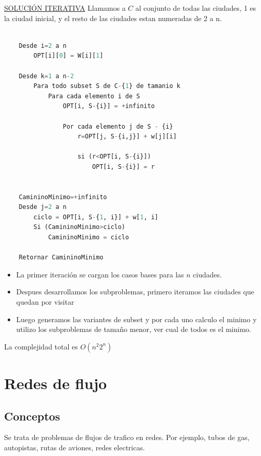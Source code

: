 \documentclass{article}
\begin{document}
\noindent
\underline{SOLUCIÓN ITERATIVA}
Llamamos a \(C\) al conjunto de todas las ciudades, 1 es la ciudad inicial, y el resto de las ciudades
estan numeradas de 2 a n.


\begin{lstlisting}[language=Python, caption=Solución iterativa]

    Desde i=2 a n
        OPT[i][0] = W[i][1]
    
    Desde k=1 a n-2
        Para todo subset S de C-{1} de tamanio k
            Para cada elemento i de S
                OPT[i, S-{i}] = +infinito

                Por cada elemento j de S - {i}
                    r=OPT[j, S-{i,j}] + w[j][i]

                    si (r<OPT[i, S-{i}])
                        OPT[i, S-{i}] = r

    
    CamininoMinimo=+infinito
    Desde j=2 a n
        ciclo = OPT[i, S-{1, i}] + w[1, i]
        Si (CamininoMinimo>ciclo)
            CamininoMinimo = ciclo
    
    Retornar CamininoMinimo

\end{lstlisting}

\begin{itemize}
    \item La primer iteración se cargan los casos bases para las \(n\) ciudades.
    \item Despues desarrollamos los subproblemas, primero iteramos las ciudades que quedan por visitar
    \item Luego generamos las variantes de subset y por cada uno calculo el minimo y 
    utilizo los subproblemas de tamaño menor, ver cual de todos es el minimo.
\end{itemize}

La complejidad total es \(O(n^2 2^n)\)

\newpage
\section{Redes de flujo}

\subsection{Conceptos}

Se trata de problemas de flujos de trafico en redes. 
Por ejemplo, tubos de gas, autopistas, rutas de aviones, redes electricas.
\end{document}
